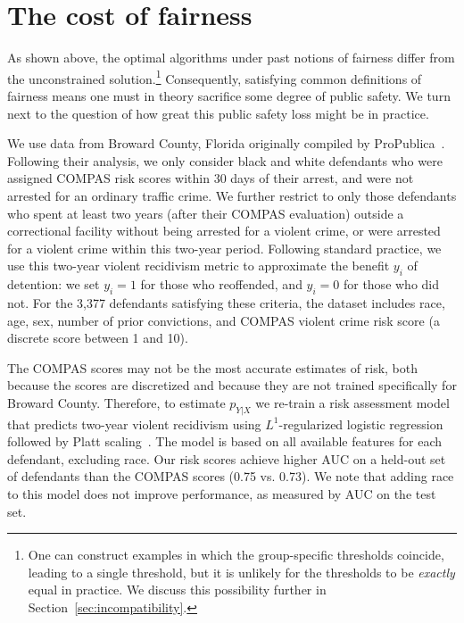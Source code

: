 \documentclass[sigconf]{acmart}
\begin{document}
\section{The cost of fairness}
\label{sec:empirical}

As shown above, the optimal algorithms under past notions of fairness differ from the unconstrained solution.\footnote{%
One can construct examples in which the group-specific thresholds coincide, 
leading to a single threshold, but it is unlikely for the thresholds to be \emph{exactly} equal in practice. 
We discuss this possibility further in Section~\ref{sec:incompatibility}.
}
Consequently, satisfying common definitions of fairness means one must in theory sacrifice some degree of public safety. 
We turn next to the question of how great this public safety loss might be in practice.

We use data from Broward County, Florida originally compiled by ProPublica~\cite{larson2016}. 
Following their analysis, we only consider black and white defendants who were assigned COMPAS risk scores within 30 days of their arrest, 
and were not arrested for an ordinary traffic crime.
We further restrict to only those defendants who spent at least two years (after their COMPAS evaluation) outside a correctional facility without being arrested for a violent crime, or were arrested for a violent crime within this two-year period.
Following standard practice, we use this two-year violent recidivism metric to approximate the benefit $y_i$ of detention: 
we set $y_i=1$ for those who reoffended, and $y_i=0$ for those who did not.
For the 3,377 defendants satisfying these criteria, 
the dataset includes race, age, sex, number of prior convictions, 
and COMPAS violent crime risk score (a discrete score between 1 and 10). 

The COMPAS scores may not be the most accurate estimates of risk, both because the scores are discretized and because they are not trained specifically for Broward County. 
Therefore, to estimate $p_{Y|X}$ we re-train a risk assessment model that predicts two-year violent recidivism using 
$L^1$-regularized logistic regression followed by Platt scaling~\cite{platt99}.
The model is based on all available features for each defendant, excluding race. 
Our risk scores achieve higher AUC on a held-out set of defendants than the COMPAS scores (0.75 vs. 0.73). 
We note that adding race to this model does not improve performance, as measured by AUC on the test set.
\end{document}
